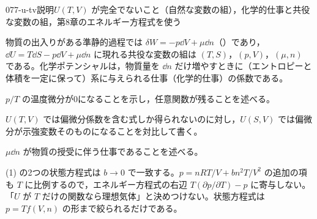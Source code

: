 \documentclass[uplatex,dvipdfmx,a4paper,11pt]{jsarticle}
\begin{document}
\begin{mondai}{077-u-tv}{説明}{$U(T,V)$ が完全でないこと（自然な変数の組），化学的仕事と共役な変数の組，第8章のエネルギー方程式を使う}
\begin{tadashii}
 物質の出入りがある準静的過程では $\delta W = -p\dd V + \mu\dd n$（）であり，$\dd U = T\dd S - p\dd V + \mu\dd n$ に現れる共役な変数の組は $(T,S)$，$(p,V)$，$(\mu,n)$ である。化学ポテンシャルは，物質量を $\dd n$ だけ増やすときに（エントロピーと体積を一定に保って）系に与えられる仕事（化学的仕事）の係数である。
\begin{ronten}
  \item {} $p/T$ の温度微分が0になることを示し，任意関数が残ることを述べる。
  \item {} $U(T,V)$ では偏微分係数を含む式しか得られないのに対し，$U(S,V)$ では偏微分が示強変数そのものになることを対比して書く。
  \item {} $\mu\dd n$ が物質の授受に伴う仕事であることを述べる。
\end{ronten}
\kenzan (1) の2つの状態方程式は $b \to 0$ で一致する。$p = nRT/V + bn^{2}T/V^{2}$ の追加の項も $T$ に比例するので，エネルギー方程式の右辺 $T(\partial p/\partial T) - p$ に寄与しない。
\tsumazuki 「$U$ が $T$ だけの関数なら理想気体」と決めつけない。状態方程式は $p = Tf(V,n)$ の形まで絞られるだけである。
\end{tadashii}
\end{mondai}
\end{document}
